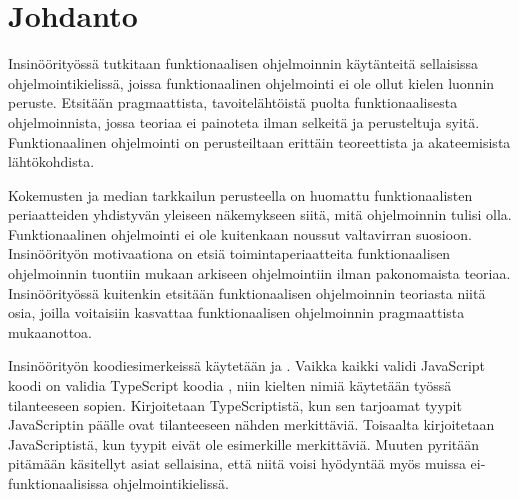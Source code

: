 
\chapter{Johdanto}


Insinöörityössä tutkitaan funktionaalisen ohjelmoinnin käytänteitä sellaisissa ohjelmointikielissä, joissa funktionaalinen ohjelmointi ei ole ollut kielen luonnin peruste. Etsitään pragmaattista, tavoitelähtöistä puolta funktionaalisesta ohjelmoinnista, jossa teoriaa ei painoteta ilman selkeitä ja perusteltuja syitä. Funktionaalinen ohjelmointi on perusteiltaan erittäin teoreettista ja akateemisista lähtökohdista.

Kokemusten ja median tarkkailun perusteella on huomattu funktionaalisten periaatteiden yhdistyvän yleiseen näkemykseen siitä, mitä ohjelmoinnin tulisi olla. Funktionaalinen ohjelmointi ei ole kuitenkaan noussut valtavirran suosioon. Insinöörityön motivaationa on etsiä toimintaperiaatteita funktionaalisen ohjelmoinnin tuontiin mukaan arkiseen ohjelmointiin ilman pakonomaista teoriaa. Insinöörityössä kuitenkin etsitään funktionaalisen ohjelmoinnin teoriasta niitä osia, joilla voitaisiin kasvattaa funktionaalisen ohjelmoinnin pragmaattista mukaanottoa.

Insinöörityön koodiesimerkeissä käytetään  ja . Vaikka kaikki validi JavaScript koodi on validia TypeScript koodia \cite{typsecript_website}, niin kielten nimiä käytetään työssä tilanteeseen sopien. Kirjoitetaan TypeScriptistä, kun sen tarjoamat tyypit JavaScriptin päälle ovat tilanteeseen nähden merkittäviä. Toisaalta kirjoitetaan JavaScriptistä, kun tyypit eivät ole esimerkille merkittäviä. Muuten pyritään pitämään käsitellyt asiat sellaisina, että niitä voisi hyödyntää myös muissa ei-funktionaalisissa ohjelmointikielissä.